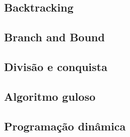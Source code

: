 \documentclass[12pt]{article}
\begin{document}
  \subsection*{Backtracking}

  

  \subsection*{Branch and Bound}

  

  \subsection*{Divisão e conquista}

  

  \subsection*{Algoritmo guloso}

  

  \subsection*{Programação dinâmica}

  
  
\end{document}
